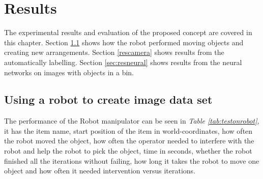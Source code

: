 \chapter{Results}
The experimental results and evaluation of the proposed concept are covered in this chapter. Section \ref{resrobotcontrol} shows how the robot performed moving objects and creating new arrangements. Section \ref{rescamera} shows results from the automatically labelling. Section \ref{sec:resneural} shows results from the neural networks on images with objects in a bin. 

\section{Using a robot to create image data set}\label{resrobotcontrol}
The performance of the Robot manipulator can be seen in \textit{Table \ref{tab:testonrobot}}, it has the item name, start position of the item in world-coordinates, how often the robot moved the object, how often the operator needed to interfere with the robot and help the robot to pick the object, time in seconds, whether the robot finished all the iterations without failing, how long it takes the robot to move one object and how often it needed intervention versus iterations. 


